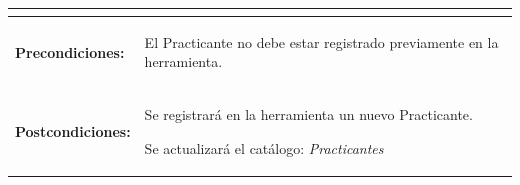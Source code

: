 \begin{table}[H]
\begin{tabular}{| l | p{12 cm} |}
\begin{compactitem}
					\end{compactitem}\\
\hline
\textbf{Precondiciones:} & \vspace{-2mm}	%
							\begin{compactitem}
								\setlength\itemsep{-0.25em}
								\item El Practicante no debe estar registrado previamente en la herramienta.
							\end{compactitem}\\
\hline
\textbf{Postcondiciones:} & \vspace{-2mm}	%
							\begin{compactitem}
								\item Se registrará en la herramienta un nuevo Practicante.
								\item Se actualizará el catálogo: \textit{Practicantes}
							\end{compactitem}\\
\hline
\end{tabular}
\end{table} 

